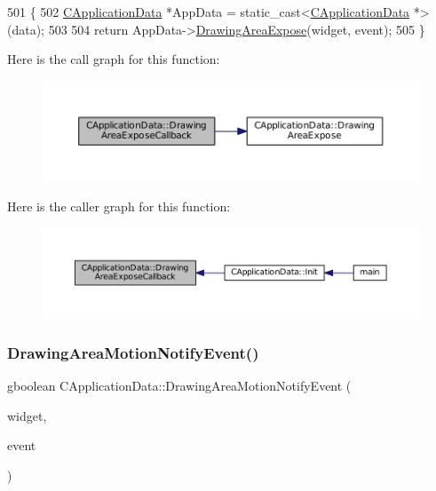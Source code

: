 \begin{DoxyCode}
501                                                                                                            
      \{
502     \hyperlink{classCApplicationData}{CApplicationData} *AppData = \textcolor{keyword}{static\_cast<}\hyperlink{classCApplicationData}{CApplicationData} *\textcolor{keyword}{>}(data);
503 
504     \textcolor{keywordflow}{return} AppData->\hyperlink{classCApplicationData_ae998e896194920e08f69f321f3bc9500}{DrawingAreaExpose}(widget, event);
505 \}
\end{DoxyCode}
Here is the call graph for this function\+:\nopagebreak
\begin{figure}[H]
\begin{center}
\leavevmode
\includegraphics[width=350pt]{classCApplicationData_af2ec09e61420f6c493d7ef25e4a7bd11_cgraph}
\end{center}
\end{figure}
Here is the caller graph for this function\+:\nopagebreak
\begin{figure}[H]
\begin{center}
\leavevmode
\includegraphics[width=350pt]{classCApplicationData_af2ec09e61420f6c493d7ef25e4a7bd11_icgraph}
\end{center}
\end{figure}
\hypertarget{classCApplicationData_a9b53201c01b399df18b02d1e93213e45}{}\label{classCApplicationData_a9b53201c01b399df18b02d1e93213e45} 
\subsubsection{\texorpdfstring{Drawing\+Area\+Motion\+Notify\+Event()}{DrawingAreaMotionNotifyEvent()}}
{\footnotesize\ttfamily gboolean C\+Application\+Data\+::\+Drawing\+Area\+Motion\+Notify\+Event (\begin{DoxyParamCaption}\item[{Gtk\+Widget $\ast$}]{widget,  }\item[{Gdk\+Event\+Motion $\ast$}]{event }\end{DoxyParamCaption})\hspace{0.3cm}{\ttfamily [protected]}}



